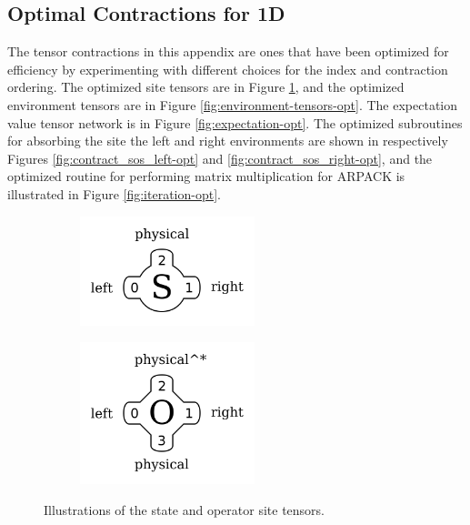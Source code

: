 \documentclass{article}
\begin{document}
\begin{appendices}
\section{Optimal Contractions for 1D}
\label{apndx:optimal-contractions}

The tensor contractions in this appendix are ones that have been optimized for efficiency by experimenting with different choices for the index and contraction ordering.  The optimized site tensors are in Figure \ref{fig:site-tensors-opt}, and the optimized environment tensors are in Figure \ref{fig:environment-tensors-opt}.  The expectation value tensor network is in Figure \ref{fig:expectation-opt}.  The optimized subroutines for absorbing the site the left and right environments are shown in respectively Figures \ref{fig:contract_sos_left-opt} and \ref{fig:contract_sos_right-opt}, and the optimized routine for performing matrix multiplication for ARPACK is illustrated in Figure \ref{fig:iteration-opt}.

\begin{figure}
\centering
\begin{subfigure}{2in}
\includegraphics[width=2in]{drawings/state_site_tensor-car}
\end{subfigure}
\begin{subfigure}{2in}
\includegraphics[width=2in]{drawings/operator_site_tensor-car}
\end{subfigure}
\caption{\label{fig:site-tensors-opt} Illustrations of the state and operator site tensors.}
\end{figure}


\end{appendices}
\end{document}
